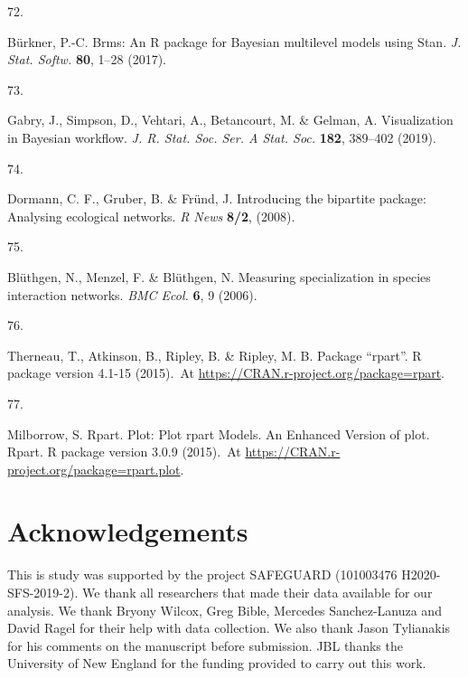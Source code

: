 \documentclass[
  12pt,
  a4paper,
]{article}
\newlength{\cslhangindent}
\newlength{\csllabelwidth}
\newlength{\cslentryspacingunit} %
\newenvironment{CSLReferences}[2] %
 {%
  \setlength{\parindent}{0pt}
  \ifodd #1
  \let\oldpar\par
  \def\par{\hangindent=\cslhangindent\oldpar}
  \fi
  \setlength{\parskip}{#2\cslentryspacingunit}
 }%
 {}
\newcommand{\CSLLeftMargin}[1]{\parbox[t]{\csllabelwidth}{#1}}
\newcommand{\CSLRightInline}[1]{\parbox[t]{\linewidth - \csllabelwidth}{#1}\break}
\begin{document}
\begin{CSLReferences}{0}{0}
\leavevmode{}%
\CSLLeftMargin{72. }
\CSLRightInline{Bürkner, P.-C. Brms: {An R} package for {Bayesian} multilevel models using {Stan}. \emph{J. Stat. Softw.} \textbf{80}, 1--28 (2017).}

\leavevmode{}%
\CSLLeftMargin{73. }
\CSLRightInline{Gabry, J., Simpson, D., Vehtari, A., Betancourt, M. \& Gelman, A. Visualization in {Bayesian} workflow. \emph{J. R. Stat. Soc. Ser. A Stat. Soc.} \textbf{182}, 389--402 (2019).}

\leavevmode{}%
\CSLLeftMargin{74. }
\CSLRightInline{Dormann, C. F., Gruber, B. \& Fründ, J. Introducing the bipartite package: Analysing ecological networks. \emph{R News} \textbf{8/2}, (2008).}

\leavevmode{}%
\CSLLeftMargin{75. }
\CSLRightInline{Blüthgen, N., Menzel, F. \& Blüthgen, N. Measuring specialization in species interaction networks. \emph{BMC Ecol.} \textbf{6}, 9 (2006).}

\leavevmode{}%
\CSLLeftMargin{76. }
\CSLRightInline{Therneau, T., Atkinson, B., Ripley, B. \& Ripley, M. B. Package {``rpart''}. R package version 4.1-15 (2015).~At \href{https://CRAN.R-project.org/package=rpart}{https://CRAN.r-project.org/package=rpart}.}

\leavevmode{}%
\CSLLeftMargin{77. }
\CSLRightInline{Milborrow, S. Rpart. Plot: {Plot} rpart {Models}. {An Enhanced Version} of plot. Rpart. R package version 3.0.9 (2015).~At \href{https://CRAN.R-project.org/package=rpart.plot}{https://CRAN.r-project.org/package=rpart.plot}.}

\end{CSLReferences}

\hypertarget{acknowledgements}{%
\section{Acknowledgements}\label{acknowledgements}}

This is study was supported by the project SAFEGUARD (101003476 H2020-SFS-2019-2). We thank all researchers that made their data available for our analysis. We thank Bryony Wilcox, Greg Bible, Mercedes Sanchez-Lanuza and David Ragel for their help with data collection. We also thank Jason Tylianakis for his comments on the manuscript before submission. JBL thanks the University of New England for the funding provided to carry out this work.
\end{document}

